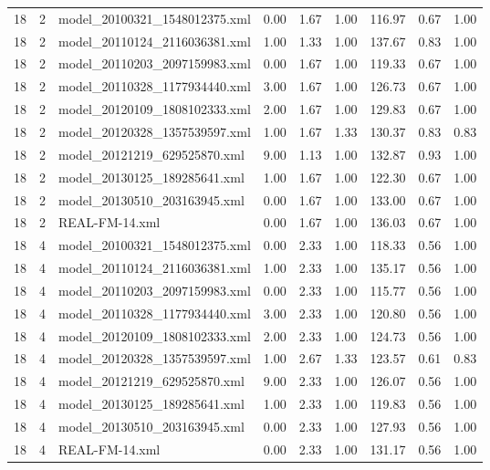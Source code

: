 \begin{table}[ht]
\begin{tabular}{rrlrrrrrr}
   18 &   2 & model\_20100321\_1548012375.xml & 0.00 & 1.67 & 1.00 & 116.97 & 0.67 & 1.00 \\ 
   18 &   2 & model\_20110124\_2116036381.xml & 1.00 & 1.33 & 1.00 & 137.67 & 0.83 & 1.00 \\ 
   18 &   2 & model\_20110203\_2097159983.xml & 0.00 & 1.67 & 1.00 & 119.33 & 0.67 & 1.00 \\ 
   18 &   2 & model\_20110328\_1177934440.xml & 3.00 & 1.67 & 1.00 & 126.73 & 0.67 & 1.00 \\ 
   18 &   2 & model\_20120109\_1808102333.xml & 2.00 & 1.67 & 1.00 & 129.83 & 0.67 & 1.00 \\ 
   18 &   2 & model\_20120328\_1357539597.xml & 1.00 & 1.67 & 1.33 & 130.37 & 0.83 & 0.83 \\ 
   18 &   2 & model\_20121219\_629525870.xml & 9.00 & 1.13 & 1.00 & 132.87 & 0.93 & 1.00 \\ 
   18 &   2 & model\_20130125\_189285641.xml & 1.00 & 1.67 & 1.00 & 122.30 & 0.67 & 1.00 \\ 
   18 &   2 & model\_20130510\_203163945.xml & 0.00 & 1.67 & 1.00 & 133.00 & 0.67 & 1.00 \\ 
   18 &   2 & REAL-FM-14.xml & 0.00 & 1.67 & 1.00 & 136.03 & 0.67 & 1.00 \\ 
   18 &   4 & model\_20100321\_1548012375.xml & 0.00 & 2.33 & 1.00 & 118.33 & 0.56 & 1.00 \\ 
   18 &   4 & model\_20110124\_2116036381.xml & 1.00 & 2.33 & 1.00 & 135.17 & 0.56 & 1.00 \\ 
   18 &   4 & model\_20110203\_2097159983.xml & 0.00 & 2.33 & 1.00 & 115.77 & 0.56 & 1.00 \\ 
   18 &   4 & model\_20110328\_1177934440.xml & 3.00 & 2.33 & 1.00 & 120.80 & 0.56 & 1.00 \\ 
   18 &   4 & model\_20120109\_1808102333.xml & 2.00 & 2.33 & 1.00 & 124.73 & 0.56 & 1.00 \\ 
   18 &   4 & model\_20120328\_1357539597.xml & 1.00 & 2.67 & 1.33 & 123.57 & 0.61 & 0.83 \\ 
   18 &   4 & model\_20121219\_629525870.xml & 9.00 & 2.33 & 1.00 & 126.07 & 0.56 & 1.00 \\ 
   18 &   4 & model\_20130125\_189285641.xml & 1.00 & 2.33 & 1.00 & 119.83 & 0.56 & 1.00 \\ 
   18 &   4 & model\_20130510\_203163945.xml & 0.00 & 2.33 & 1.00 & 127.93 & 0.56 & 1.00 \\ 
   18 &   4 & REAL-FM-14.xml & 0.00 & 2.33 & 1.00 & 131.17 & 0.56 & 1.00 \\ 

\end{tabular}
\end{table}
